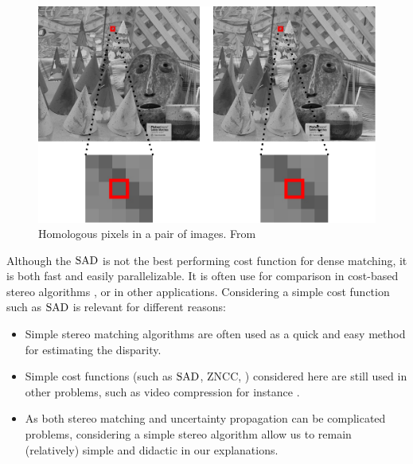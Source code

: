 \begin{figure}[ht]
  \centering
  \includegraphics[width=0.8\linewidth]{Images/Chap_4/Cones.png}
  \caption{Homologous pixels in a pair of images. From \cite{malinowski_uncertainty_2024}}\label{fig:Cones}
\end{figure}

\begin{remark}
    Although the $\mathrm{SAD}$ is not the best performing cost function for dense matching, it is both fast and easily parallelizable. It is often use for comparison in cost-based stereo algorithms \cite{hirschmuller_evaluation_2007, zbontar_stereo_2016}, or in other applications. Considering a simple cost function such as $\mathrm{SAD}$ is relevant for different reasons:
    \begin{itemize}
        \item Simple stereo matching algorithms are often used as a quick and easy method for estimating the disparity.
        \item Simple cost functions (such as $\mathrm{SAD}$, ZNCC, \etc) considered here are still used in other problems, such as video compression for instance \cite{richardson_h264_2006}.
        \item As both stereo matching and uncertainty propagation can be complicated problems, considering a simple stereo algorithm allow us to remain (relatively) simple and didactic in our explanations. 
    \end{itemize}
\end{remark}

